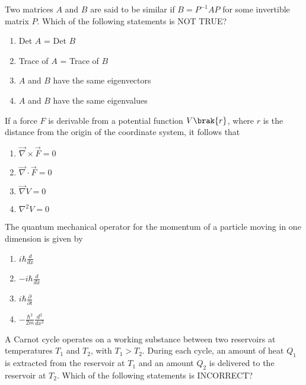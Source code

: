 \iffalse
    \title{Assignment}
    \author{EE24BTECH11009}
    \section{ph}
    \chapter{2011}
  \fi
\item Two matrices $A$ and $B$ are said to be similar if $B = P^{-1}AP$ for some invertible matrix $P$. Which of the following statements is NOT TRUE?
\begin{enumerate}
    \item Det $A$ = Det $B$
    \item Trace of $A$ = Trace of $B$
    \item $A$ and $B$ have the same eigenvectors
    \item $A$ and $B$ have the same eigenvalues
    \end{enumerate}
\item If a force $F$ is derivable from a potential function $V\brak{r}$, where $r$ is the distance from the origin of the coordinate system, it follows that
\begin{enumerate}
    \item $\overrightarrow{\nabla} \times \overrightarrow{F} = 0$
    \item $\overrightarrow{\nabla} \cdot \overrightarrow{F} = 0$
    \item $\overrightarrow{\nabla} V = 0$
    \item $\nabla^2 V = 0$
\end{enumerate}
\item The quantum mechanical operator for the momentum of a particle moving in one dimension is given by
\begin{enumerate}
    \item $i\hbar\frac{d}{dx}$
    \item $-i\hbar\frac{d}{dx}$
    \item $i\hbar\frac{\partial}{\partial t}$
    \item $-\frac{\hbar^2}{2m}\frac{d^2}{dx^2}$
\end{enumerate}
\item A Carnot cycle operates on a working substance between two reservoirs at temperatures $T_1$ and $T_2$, with $T_1 > T_2$. During each cycle, an amount of heat $Q_1$ is extracted from the reservoir at $T_1$ and an amount $Q_2$ is delivered to the reservoir at $T_2$. Which of the following statements is INCORRECT?
